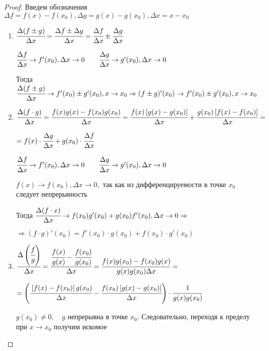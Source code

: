 \begin{proof}
    Введем обозначения $\Delta f = f (x) - f(x_{0}), \Delta g = g(x) - g(x_{0}), \Delta x = x - x_{0} $
    \begin{enumerate}
        \item $\cfrac{\Delta(f \pm g)}{\Delta x} = \cfrac{\Delta f \pm \Delta g}{\Delta x} = \cfrac{\Delta f}{\Delta x} \pm \cfrac{\Delta g}{\Delta x} $

        $
        \cfrac{\Delta f}{\Delta x} \to f'(x_{0}), \Delta x \to 0 \quad \quad \cfrac{\Delta g}{\Delta x} \to g'(x_{0}), \Delta x \to 0 
        $

        Тогда $
         \cfrac{\Delta(f \pm g)}{\Delta x} \to f'(x_{0}) \pm g'(x_{0}), x \to x_{0}        \Rightarrow (f \pm g)'(x_{0}) \to f'(x_{0}) \pm g'(x_{0}), x \to x_{0}
        $
        \item $\cfrac{\Delta(f\cdot g)}{\Delta x} = \cfrac{f(x) g(x) - f(x_{0}) g(x_{0})}{\Delta x} = \cfrac{f(x) \left[  g(x) - g(x_{0}) \right]}{\Delta x} + \cfrac{g(x_{0}) \left[ f(x) - f(x_{0})\right]}{\Delta x} =$

        $
        = f(x) \cdot \cfrac{\Delta g}{\Delta x} + g(x_{0}) \cdot \cfrac{\Delta f}{\Delta x}
        $

        $
        \cfrac{\Delta f}{\Delta x} \to f'(x_{0}), \Delta x \to 0 \quad \quad \cfrac{\Delta g}{\Delta x} \to g'(x_{0}), \Delta x \to 0 
        $
        
        $
        f(x) \to f(x_{0}), \Delta x\to 0,$ так как из дифференцируемости в точке $x_{0}$ следует непрерывность

        Тогда $ \cfrac{\Delta (f\cdot x)}{\Delta x} \to f(x_{0}) g'(x_{0}) + g(x_{0})f'(x_{0}), \Delta x \to 0 \Rightarrow $
        
        $\Rightarrow (f \cdot g)'(x_{0}) = f'(x_{0}) \cdot g({x_{0}}) + f(x_{0}) \cdot g'({x_{0}})$
        \item $\cfrac{\Delta \left(\cfrac{f}{g} \right)}{\Delta x} = \cfrac{\cfrac{f(x)}{g(x)} - \cfrac{f(x_{0})}{g(x_{0})}}{\Delta x} = \cfrac{f(x)g(x_{0}) - f(x_{0})g(x)}{g(x) g(x_{0}) \Delta x}= $

        $
        =\left(\cfrac{\left[f(x) - f(x_{0})\right] g(x_{0})}{\Delta x} - \cfrac{f(x_{0})\left[g(x) - g(x_{0})\right]}{\Delta x} \right) \cdot \cfrac{1}{g(x) g(x_{0})}
        $

        $ g(x_{0}) \neq 0, \quad g$ непрерывна в точке $x_{0}.$ Следовательно, переходя к пределу  при $x\to x_{0}$ получим искомое 
    \end{enumerate}
\end{proof}

